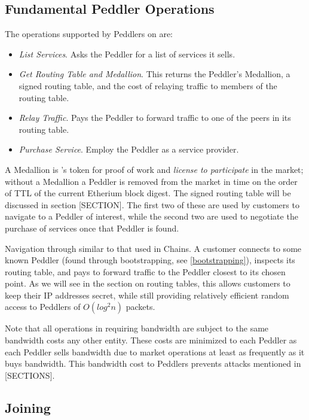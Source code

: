 \subsection{Fundamental Peddler Operations}

The operations supported by Peddlers on \tOM{} are:

\begin{itemize}
\item \emph{List Services}. Asks the Peddler for a list of services it sells.
\item \emph{Get Routing Table and Medallion}. This returns the Peddler's Medallion, a signed routing table, and the cost of relaying traffic to members of the routing table.
\item \emph{Relay Traffic}. Pays the Peddler to forward traffic to one of the peers in its routing table.
\item \emph{Purchase Service}. Employ the Peddler as a service provider.
\end{itemize}

A Medallion is \TOM{}'s token for proof of work and \textit{license to participate} in the market; without a Medallion a Peddler is removed from the market in time on the order of TTL of the current Etherium block digest. The signed routing table will be discussed in section {\color{red}[SECTION]}. The first two of these are used by customers to navigate to a Peddler of interest, while the second two are used to negotiate the purchase of services once that Peddler is found.

{\color{red} Navigation through \tOM{} similar to that used in Chains. A customer connects to some known Peddler (found through
bootstrapping, see \ref{bootstrapping}), inspects its routing table, and pays to forward traffic to the Peddler closest to its chosen point. As we will see in the section on routing tables, this allows customers to keep their IP addresses secret, while still providing relatively efficient random access to Peddlers of $O(log^2 n)$ packets.}

Note that all operations in \TOM{} requiring bandwidth are subject to the same bandwidth costs any other entity. These costs are minimized to each Peddler as each Peddler sells bandwidth due to market operations at least as frequently as it buys bandwidth. This bandwidth cost to Peddlers prevents attacks mentioned in {\color{red}[SECTIONS]}.

\subsection{Joining \TOM{}}

